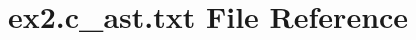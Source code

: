 \hypertarget{ex2_8c__ast_8txt}{}\section{ex2.\+c\+\_\+ast.\+txt File Reference}
\label{ex2_8c__ast_8txt}
